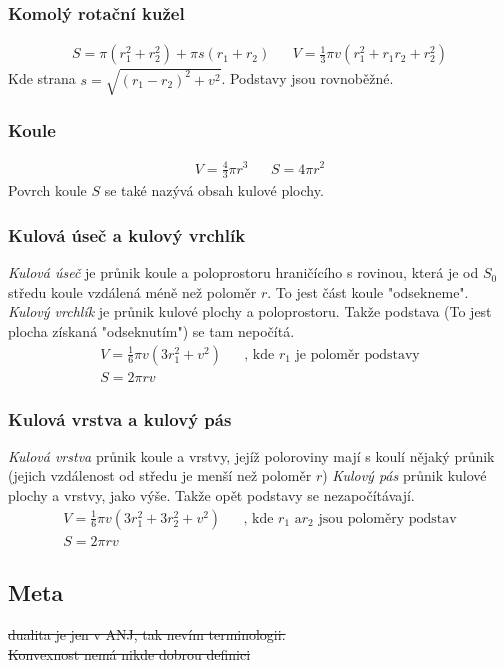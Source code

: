 \documentclass[12pt]{article}
\begin{document}
\subsubsection{Komolý rotační kužel}
\begin{align}
S = \pi  \left( r_1^2 + r_2^2\right) + \pi s  \left( r_1 + r_2\right)  && V = \frac{1}{3}\pi v \left( r_1^2 + r_1 r_2 + r_2^2\right)
\end{align}
Kde strana $s = \sqrt{(r_1-r_2)^2 + v^2}$. Podstavy jsou rovnoběžné.
\subsubsection{Koule}
\begin{align}
V =\frac{4}{3} \pi r^3 && S = 4 \pi r^2
\end{align}
Povrch koule $S$ se také nazývá obsah kulové plochy.
\subsubsection{Kulová úseč a kulový vrchlík}
\emph{Kulová úseč} je průnik koule a poloprostoru hraničícího s rovinou, která je od $S_0$ středu koule vzdálená méně než poloměr $r$. To jest část koule "odsekneme".\\
\emph{Kulový vrchlík} je  průnik kulové plochy a poloprostoru. Takže podstava (To jest plocha získaná "odseknutím") se tam nepočítá.
\begin{align}
V = \frac{1}{6} \pi v \left(3r_1^2 + v^2\right) && \text{, kde $r_1$ je poloměr podstavy}\\
S = 2 \pi rv
\end{align}
\subsubsection{Kulová vrstva a kulový pás}
\emph{Kulová vrstva} průnik koule a vrstvy, jejíž poloroviny mají s koulí nějaký průnik (jejich vzdálenost od středu je menší než poloměr $r$)
\emph{Kulový pás} průnik kulové plochy a vrstvy, jako výše. Takže opět podstavy se nezapočítávají.
\begin{align}
V = \frac{1}{6} \pi v \left(3r_1^2 +3r_2^2 + v^2\right) && \text{, kde $r_1$ a$r_2$ jsou poloměry podstav}\\
S = 2 \pi rv
\end{align}

\subsection{Meta}
\st{dualita je jen v ANJ, tak nevím terminologii.}\\
\st{Konvexnost nemá nikde dobrou definici}\\
\end{document}
